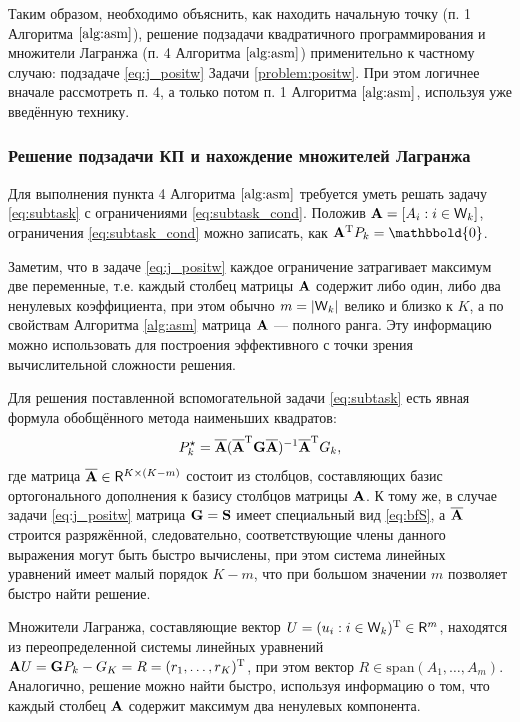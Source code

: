 \documentclass[10pt]{article}
\begin{document}
Таким образом, необходимо объяснить, как находить начальную точку (п. 1 Алгоритма $\ref{alg:asm}$), решение подзадачи квадратичного программирования и множители Лагранжа (п. 4 Алгоритма $\ref{alg:asm}$) применительно к частному случаю: подзадаче \eqref{eq:j_positw} Задачи \ref{problem:positw}. При этом логичнее вначале рассмотреть п. 4, а только потом п. 1 Алгоритма $\ref{alg:asm}$, используя уже введённую технику.


\subsubsection{Решение подзадачи КП и нахождение множителей Лагранжа}
Для выполнения пункта 4 Алгоритма $\ref{alg:asm}$ требуется уметь решать задачу \eqref{eq:subtask} с ограничениями \eqref{eq:subtask_cond}. Положив $\mathbf{A} = [A_i : i \in \mathsf{W}_k]$, ограничения \eqref{eq:subtask_cond} можно записать, как $\bfA^\rmT P_k = \mathbbold{0}$.

Заметим, что в задаче \eqref{eq:j_positw} каждое ограничение затрагивает максимум две переменные, т.е. каждый столбец матрицы $\mathbf{A}$ содержит либо один, либо два ненулевых коэффициента, при этом обычно $m = |\mathsf{W}_k|$ велико и близко к $K$, а по свойствам Алгоритма \ref{alg:asm} матрица $\mathbf{A}$ --- полного ранга. Эту информацию можно использовать для построения эффективного с точки зрения вычислительной сложности решения.

Для решения поставленной вспомогательной задачи \eqref{eq:subtask} есть явная формула обобщённого метода наименьших квадратов:
\begin{equation*}
P_k^\star = \overline {\mathbf{A}} (\overline {\mathbf{A}}^{\mathrm{T}} \mathbf{G} \overline {\mathbf{A}})^{-1} \overline {\mathbf{A}}^{\mathrm{T}} G_k,
\end{equation*}
где матрица $\overline {\mathbf{A}} \in \mathsf{R}^{K \times (K-m)}$ состоит из столбцов, составляющих базис ортогонального дополнения к базису столбцов матрицы $\mathbf{A}$. К тому же, в случае задачи \eqref{eq:j_positw} матрица $\mathbf{G} = \mathbf{S}$ имеет специальный вид \eqref{eq:bfS}, а $\overline {\mathbf{A}}$ строится разряжённой, следовательно, соответствующие члены данного выражения могут быть быстро вычислены, при этом система линейных уравнений имеет малый порядок $K-m$, что при большом значении $m$ позволяет быстро найти решение.

Множители Лагранжа, составляющие вектор $U = (u_i : i \in \mathsf{W}_k)^{\mathrm{T}} \in \mathsf{R}^{m}$, находятся из переопределенной системы линейных уравнений $\mathbf{A} U =  \mathbf{G} P_k - G_K = R = (r_1, \ldots, r_K)^{\mathrm{T}}$, при этом вектор $R \in \text{span}(A_1, \ldots, A_m)$. Аналогично, решение можно найти быстро, используя информацию о том, что каждый столбец $\mathbf{A}$ содержит максимум два ненулевых компонента.
\end{document}
